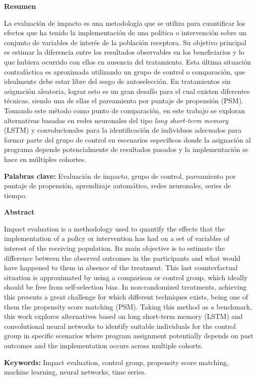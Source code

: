 \documentclass[../main.tex]{subfiles}
\begin{document}
\noindent \textbf{Resumen}

La evaluación de impacto es una metodología que se utiliza para cuantificar los efectos
que ha tenido la implementación de una política o intervención sobre un conjunto de
variables de interés de la población receptora. Su objetivo principal es estimar la
diferencia entre los resultados observables en los beneficiarios y lo que hubiera ocurrido
con ellos en ausencia del tratamiento. Esta última situación contrafáctica es aproximada
utilizando un grupo de control o comparación, que idealmente debe estar libre del sesgo de
autoselección. En tratamientos sin asignación aleatoria, lograr esto es un gran desafío
para el cual existen diferentes técnicas, siendo una de ellas el pareamiento por puntaje
de propensión (PSM). Tomando este método como punto de comparación, en este trabajo se
exploran alternativas basadas en redes neuronales del tipo \textit{long short-term memory}
(LSTM) y convolucionales para la identificación de individuos adecuados para formar parte
del grupo de control en escenarios específicos donde la asignación al programa depende
potencialmente de resultados pasados y la implementación se hace en múltiples cohortes.

\medskip

\noindent \textbf{Palabras clave: } Evaluación de impacto, grupo de control, pareamiento
por puntaje de propensión, aprendizaje automático, redes neuronales, series de tiempo.

\bigskip
\bigskip

\noindent \textbf{Abstract}

Impact evaluation is a methodology used to quantify the effects that the implementation of
a policy or intervention has had on a set of variables of interest of the receiving
population. Its main objective is to estimate the difference between the observed
outcomes in the participants and what would have happened to them in absence of the
treatment. This last counterfactual situation is approximated by using a comparison or
control group, which ideally should be free from self-selection bias. In non-randomized
treatments, achieving this presents a great challenge for which different techniques
exists, being one of them the propensity score matching (PSM). Taking this method as a
benchmark, this work explores alternatives based on long short-term memory (LSTM) and
convolutional neural networks to identify suitable individuals for the control group in
specific scenarios where program assignment potentially depends on past outcomes and the
implementation occurs across multiple cohorts.

\medskip

\noindent \textbf{Keywords: } Impact evaluation, control group, propensity score matching,
machine learning, neural networks, time series.
\end{document}

